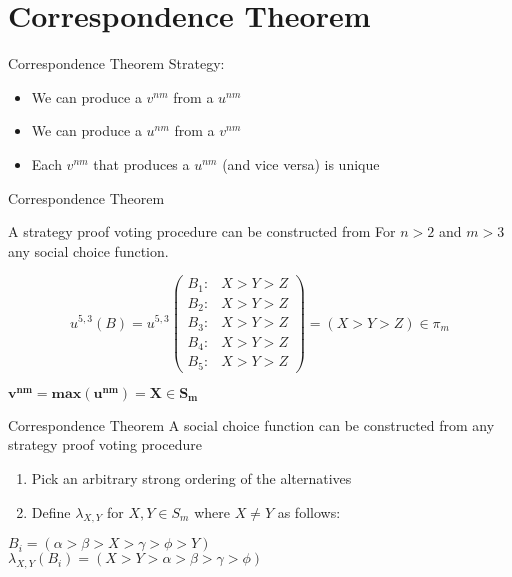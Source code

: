 \documentclass{beamer}
\begin{document}
\section{Correspondence Theorem}

\begin{frame}{Correspondence Theorem}
    Strategy:

    \begin{itemize}
        \item We can produce a $v^{nm}$ from a $u^{nm}$
        \item We can produce a $u^{nm}$ from a $v^{nm}$
        \item Each $v^{nm}$ that produces a $u^{nm}$ (and vice versa) is unique
    \end{itemize}
\end{frame}

\begin{frame}{Correspondence Theorem}

A strategy proof voting procedure can be constructed from For $n > 2$ and $m > 3$ any social choice function.

    \large \begin{equation*}
  u^{5,3}(B) = u^{5,3}\left(
    \begin{array}{cc}
      B_1: & \text{$X > Y > Z$}\\
      B_2: & \text{$X > Y > Z$}\\
      B_3: & \text{$X > Y > Z$}\\
      B_4: & \text{$X > Y > Z$}\\ 
      B_5: & \text{$X > Y > Z$}
    \end{array} 
    \right) = (X > Y > Z) \in \pi_m
\end{equation*}

\vskip 1cm

\center $\mathbf{v^{nm} = max(u^{nm}) = X \in S_m}$
\end{frame}

\begin{frame}{Correspondence Theorem}
    A social choice function can be constructed from any strategy proof voting procedure

    \vskip 0.5cm

    \begin{enumerate}
        \item Pick an arbitrary strong ordering of the alternatives
        \item Define $\lambda_{X,Y}$ for $X,Y \in S_m$ where $X \ne Y$ as follows:
    \end{enumerate}

    \vskip 1cm

        \Large \center $B_i = (\alpha > \beta > X > \gamma > \phi > Y)$ \\
        \vskip 0.25cm
        $\lambda_{X,Y}(B_i) = (X > Y > \alpha > \beta > \gamma > \phi )$
\end{frame}
\end{document}
